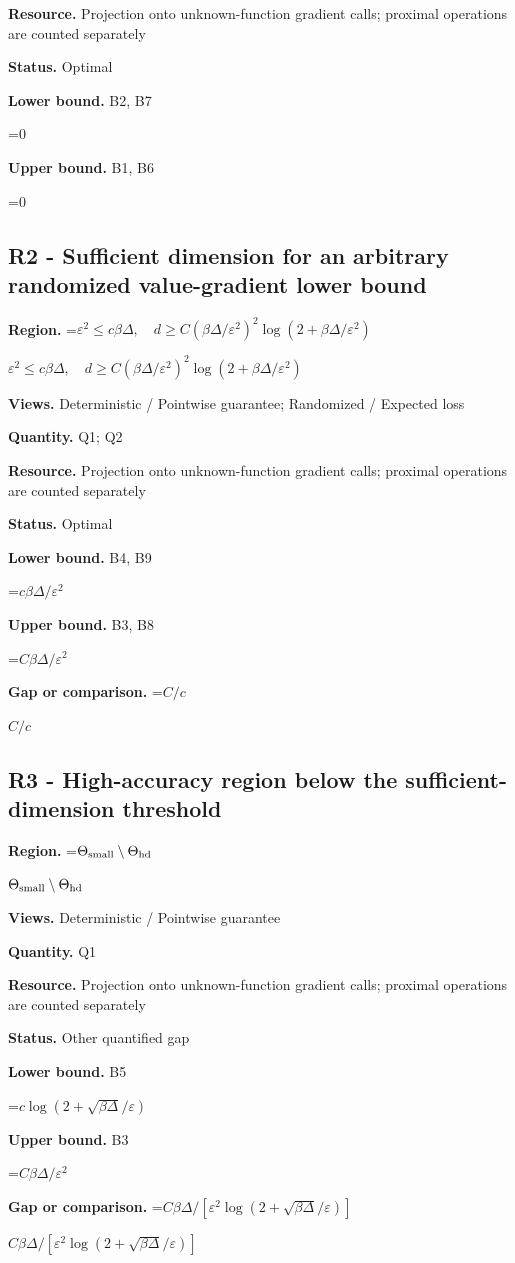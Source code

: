 \documentclass[10pt,a4paper]{article}
\newcommand{\AtlasMath}[1]{\par\begingroup\centering\setbox0=\hbox{$\displaystyle #1$}\ifdim\wd0>1.4\linewidth\typeout{ATLAS WIDE FORMULA: \the\wd0}\fi\ifdim\wd0>\linewidth\resizebox{\linewidth}{!}{\box0}\else\box0\fi\par\endgroup}
\newcommand{\AtlasInlineMath}[1]{\begingroup\setbox0=\hbox{$#1$}\ifdim\wd0>.4\linewidth\endgroup\AtlasMath{#1}\else\endgroup$#1$\fi}
\begin{document}
\textbf{Resource.} Projection onto unknown-function gradient calls; proximal operations are counted separately

\textbf{Status.} Optimal

\textbf{Lower bound.} B2, B7

\AtlasMath{0}
\textbf{Upper bound.} B1, B6

\AtlasMath{0}
\subsection{R2 - Sufficient dimension for an arbitrary randomized value-gradient lower bound}
\textbf{Region.} \AtlasInlineMath{\varepsilon^2\le c\beta\Delta,\quad d\ge C(\beta\Delta/\varepsilon^2)^2\log(2+\beta\Delta/\varepsilon^2)}

\textbf{Views.} Deterministic / Pointwise guarantee; Randomized / Expected loss

\textbf{Quantity.} Q1; Q2

\textbf{Resource.} Projection onto unknown-function gradient calls; proximal operations are counted separately

\textbf{Status.} Optimal

\textbf{Lower bound.} B4, B9

\AtlasMath{c\beta\Delta/\varepsilon^2}
\textbf{Upper bound.} B3, B8

\AtlasMath{C\beta\Delta/\varepsilon^2}
\textbf{Gap or comparison.} \AtlasInlineMath{C/c}

\subsection{R3 - High-accuracy region below the sufficient-dimension threshold}
\textbf{Region.} \AtlasInlineMath{\Theta_{\rm small}\setminus\Theta_{\rm hd}}

\textbf{Views.} Deterministic / Pointwise guarantee

\textbf{Quantity.} Q1

\textbf{Resource.} Projection onto unknown-function gradient calls; proximal operations are counted separately

\textbf{Status.} Other quantified gap

\textbf{Lower bound.} B5

\AtlasMath{c\log(2+\sqrt{\beta\Delta}/\varepsilon)}
\textbf{Upper bound.} B3

\AtlasMath{C\beta\Delta/\varepsilon^2}
\textbf{Gap or comparison.} \AtlasInlineMath{C\beta\Delta/[\varepsilon^2\log(2+\sqrt{\beta\Delta}/\varepsilon)]}
\end{document}
